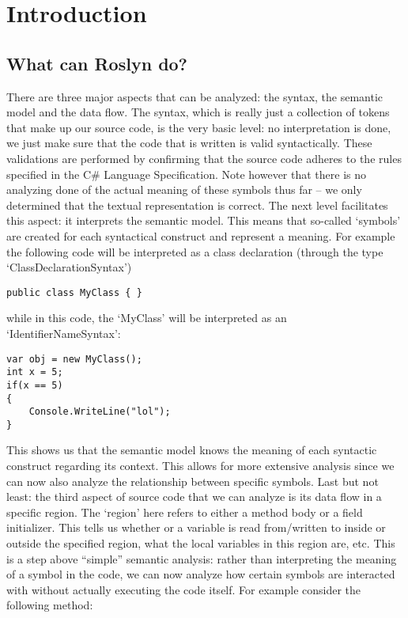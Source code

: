 \chapter{Introduction}
\label{ch:introduction}

\section{What can Roslyn do?}
\label{sec:intro-what}

There are three major aspects that can be analyzed: the syntax, the semantic model and the data flow. 
The syntax, which is really just a collection of tokens that make up our source code, is the very basic level: no interpretation is done, we just make sure that the code that is written is valid syntactically. These validations are performed by confirming that the source code adheres to the rules specified in the C\# Language Specification. Note however that there is no analyzing done of the actual meaning of these symbols thus far – we only determined that the textual representation is correct.
The next level facilitates this aspect: it interprets the semantic model. This means that so-called ‘symbols’ are created for each syntactical construct and represent a meaning. For example the following code will be interpreted as a class declaration (through the type ‘ClassDeclarationSyntax’)

\lstset{style=sharpc}
\begin{lstlisting}
public class MyClass { }
\end{lstlisting}

	
while in this code, the ‘MyClass’ will be interpreted as an ‘IdentifierNameSyntax’:

   
\lstset{style=sharpc}
\begin{lstlisting}
var obj = new MyClass();
int x = 5;
if(x == 5)
{
	Console.WriteLine("lol");
}
\end{lstlisting}  
	
This shows us that the semantic model knows the meaning of each syntactic construct regarding its context. This allows for more extensive analysis since we can now also analyze the relationship between specific symbols. 
Last but not least: the third aspect of source code that we can analyze is its data flow in a specific region. The ‘region’ here refers to either a method body or a field initializer. This tells us whether or a variable is read from/written to inside or outside the specified region, what the local variables in this region are, etc. This is a step above “simple” semantic analysis: rather than interpreting the meaning of a symbol in the code, we can now analyze how certain symbols are interacted with without actually executing the code itself.
For example consider the following method:

